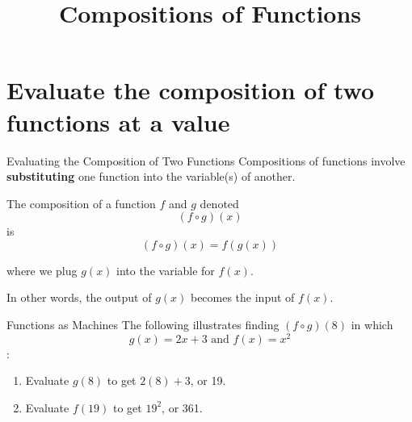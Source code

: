 \documentclass[t]{beamer}
\title{Compositions of Functions}
\author{}
\date{}
\begin{document}
\begin{frame}
    \maketitle
\end{frame}

\section{Evaluate the composition of two functions at a value}

\begin{frame}{Evaluating the Composition of Two Functions}
Compositions of functions involve {\color{blue}\textbf{substituting}} one function into the variable(s) of another.	\newline\\	\pause

The composition of a function $f$ and $g$ denoted
\[ (f \circ g)(x) \]
is
\[(f \circ g)(x) = f(g(x)) \]

where we plug $g(x)$ into the variable for $f(x)$.	\newline\\	\pause

In other words, the output of $g(x)$ becomes the input of $f(x)$.
\end{frame}

\begin{frame}{Functions as Machines}
The following illustrates finding $(f \circ g)(8)$ in which \[g(x)=2x+3 \text{ and } f(x) = x^2\]:		\pause

\begin{center}
\end{center}	\pause
\begin{enumerate}
\item<+-> Evaluate $g(8)$ to get $2(8)+3$, or 19. \newline\\
\item<+-> Evaluate $f(19)$ to get $19^2$, or 361.
\end{enumerate}
\end{frame}
\end{document}
